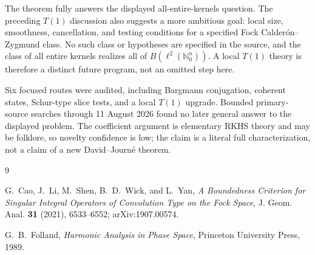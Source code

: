 \documentclass[11pt]{article}
\theoremstyle{remark}
\newcommand{\ellTwo}{\ell^2(\mathbb{N}_0^n)}
\begin{document}
The theorem fully answers the displayed all-entire-kernels question.  The
preceding $T(1)$ discussion also suggests a more ambitious goal: local size,
smoothness, cancellation, and testing conditions for a specified Fock
Calderón--Zygmund class.  No such class or hypotheses are specified in the
source, and the class of all entire kernels realizes all of
$B(\ellTwo)$.  A local $T(1)$ theory is therefore a distinct future program,
not an omitted step here.

Six focused routes were audited, including Bargmann conjugation, coherent
states, Schur-type slice tests, and a local $T(1)$ upgrade.  Bounded
primary-source searches through 11 August 2026 found no later general answer
to the displayed problem.  The coefficient argument is elementary RKHS
theory and may be folklore, so novelty confidence is low; the claim is a
literal full characterization, not a claim of a new David--Journé theorem.

\begin{thebibliography}{9}

G.~Cao, J.~Li, M.~Shen, B.~D.~Wick, and L.~Yan,
\emph{A Boundedness Criterion for Singular Integral Operators of Convolution
Type on the Fock Space}, J. Geom. Anal. \textbf{31} (2021), 6533--6552;
arXiv:1907.00574.

G.~B.~Folland,
\emph{Harmonic Analysis in Phase Space},
Princeton University Press, 1989.

\end{thebibliography}
\end{document}
